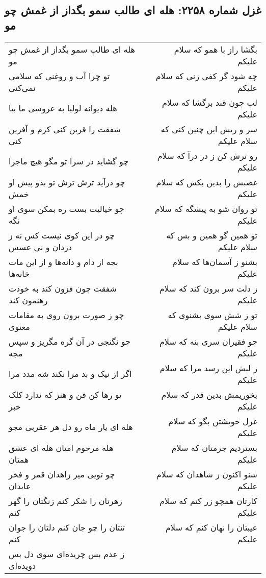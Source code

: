 \begin{center}
\section*{غزل شماره ۲۲۵۸: هله ای طالب سمو بگداز از غمش چو مو}
\label{sec:2258}
\begin{longtable}{l p{0.5cm} r}
هله ای طالب سمو بگداز از غمش چو مو
&&
بگشا راز با همو که سلام علیکم
\\
تو چرا آب و روغنی که سلامی نمی‌کنی
&&
چه شود گر کفی زنی که سلام علیکم
\\
هله دیوانه لولیا به عروسی ما بیا
&&
لب چون قند برگشا که سلام علیکم
\\
شفقت را قرین کنی کرم و آفرین کنی
&&
سر و ریش این چنین کنی که سلام علیکم
\\
چو گشاید در سرا تو مگو هیچ ماجرا
&&
رو ترش کن ز در درآ که سلام علیکم
\\
چو درآید ترش ترش تو بدو پیش او خمش
&&
غضبش را بدین بکش که سلام علیکم
\\
چو خیالیت بست ره بمکن سوی او نگه
&&
تو روان شو به پیشگه که سلام علیکم
\\
چو در این کوی نیست کس نه ز دزدان و نی عسس
&&
تو همین گو همین و بس که سلام علیکم
\\
بجه از دام و دانه‌ها و از این مات خانه‌ها
&&
بشنو ز آسمان‌ها که سلام علیکم
\\
شفقت چون فزون کند به خودت رهنمون کند
&&
ز دلت سر برون کند که سلام علیکم
\\
چو ز صورت برون روی به مقامات معنوی
&&
تو ز شش سوی بشنوی که سلام علیکم
\\
چو نگنجی در آن گره مگریز و سپس مجه
&&
چو فقیران سری بنه که سلام علیکم
\\
اگر از نیک و بد مرا نکند شه مدد مرا
&&
ز لبش این رسد مرا که سلام علیکم
\\
تو رها کن فن و هنر که ندارد کلک خبر
&&
بخوریمش بدین قدر که سلام علیکم
\\
هله ای یار ماه رو دل هر عقربی مجو
&&
غزل خویشتن بگو که سلام علیکم
\\
هله مرحوم امتان هله ای عشق همتان
&&
بستردیم جرمتان که سلام علیکم
\\
چو تویی میر زاهدان قمر و فخر عابدان
&&
شنو اکنون ز شاهدان که سلام علیکم
\\
زهرتان را شکر کنم زنگتان را گهر کنم
&&
کارتان همچو زر کنم که سلام علیکم
\\
تنتان را چو جان کنم دلتان را جوان کنم
&&
عیبتان را نهان کنم که سلام علیکم
\\
ز عدم بس چریده‌ای سوی دل بس دویده‌ای

\end{longtable}
\end{center}

